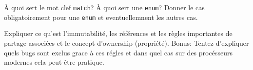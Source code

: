 \documentclass[11pt,a4paper,addpoint]{exam}
\begin{document}
\begin{questions}
\begin{solution}
\end{solution}
\else
\vspace{2in}
\fi

\question[1] À quoi sert le mot clef \texttt{match}? À quoi sert une \texttt{enum}? Donner le cas obligatoirement pour une \texttt{enum} et eventuellemnent les autres cas.
\ifprintanswers
\begin{solution}

\end{solution}
\else
\vspace{3in}
\fi

\question[1] Expliquer ce qu'est l'immutabilité, les références et les règles importantes de partage associées et le concept d'ownership (propriété). Bonus: Tentez d'expliquer quels bugs sont exclus grace à ces régles et dans quel cas sur des procésseurs modernes cela peut-être pratique.
\ifprintanswers
\begin{solution}

\end{solution}
\else
\vspace{1in}
\fi

\end{questions}
\end{document}

